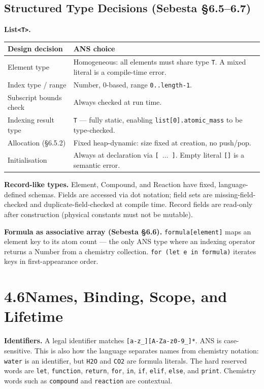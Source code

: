 \documentclass[11pt,a4paper]{article}
\newcommand{\code}[1]{\texttt{#1}}
\begin{document}
\subsection{Structured Type Decisions (Sebesta \S6.5--6.7)}

\textbf{List\texttt{<T>}.}

\begin{tabularx}{\textwidth}{@{} L{3.8cm} Y @{}}
\toprule
\textbf{Design decision} & \textbf{ANS choice} \\
\midrule
Element type & Homogeneous: all elements must share type \code{T}. A mixed literal is a compile-time error. \\
Index type / range & Number, 0-based, range \code{0..length-1}. \\
Subscript bounds check & Always checked at run time. \\
Indexing result type & \code{T} --- fully static, enabling \code{list[0].atomic\_mass} to be type-checked. \\
Allocation (§6.5.2) & Fixed heap-dynamic: size fixed at creation, no push/pop. \\
Initialisation & Always at declaration via \code{[ $\ldots$ ]}. Empty literal \code{[]} is a semantic error. \\
\bottomrule
\end{tabularx}

\vspace{4pt}
\textbf{Record-like types.} Element, Compound, and Reaction have fixed, language-defined schemas. Fields are accessed via dot notation; field sets are missing-field-checked and duplicate-field-checked at compile time. Record fields are read-only after construction (physical constants must not be mutable).

\textbf{Formula as associative array (Sebesta \S6.6).} \code{formula[element]} maps an element key to its atom count --- the only ANS type where an indexing operator returns a Number from a chemistry collection. \code{for (let e in formula)} iterates keys in first-appearance order.

\newpage
\section{4.6\quad Names, Binding, Scope, and Lifetime}

\textbf{Identifiers.} A legal identifier matches \code{[a-z\_][A-Za-z0-9\_]*}. ANS is
case-sensitive. This is also how the language separates names from chemistry notation:
\code{water} is an identifier, but \code{H2O} and \code{CO2} are formula literals. The hard
reserved words are \code{let}, \code{function}, \code{return}, \code{for}, \code{in}, \code{if},
\code{elif}, \code{else}, and \code{print}. Chemistry words such as \code{compound} and
\code{reaction} are contextual.
\end{document}
